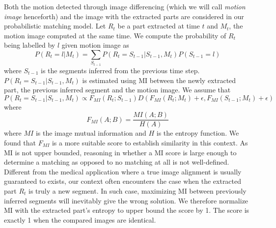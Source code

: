 \documentclass{article}
\begin{document}
Both the motion detected through image differencing (which we will call \emph{motion image} henceforth) and the image with the extracted parts are considered in our probabilistic matching model. Let $R_t$ be a part extracted at time $t$ and $M_t$, the motion image computed at the same time. We compute the probability of $R_t$ being labelled by $l$ given motion image as
\begin{equation}
	P(R_t = l | M_t) = \sum_{S_{t-1}} P(R_t = S_{t-1} | S_{t-1}, M_t)P(S_{t-1} = l)
\end{equation}
where $S_{t-1}$ is the segments inferred from the previous time step. $P(R_t = S_{t-1} | S_{t-1}, M_t)$ is estimated using MI between the newly extracted part, the previous inferred segment and the motion image. We assume that 
\begin{equation}\label{eq:blab}
	P(R_t = S_{t-1} | S_{t-1}, M_t) \propto F_{MI}(R_t; S_{t-1})D(F_{MI}(R_t; M_t) + \epsilon, F_{MI}(S_{t-1}; M_t) + \epsilon)
\end{equation}
where
\begin{equation}
	F_{MI}(A;B) = \frac{MI(A;B)}{H(A)}
\end{equation}
where $MI$ is the image mutual information and $H$ is the entropy function. We found that $F_{MI}$ is a more suitable score to establish similarity in this context. As MI is not upper bounded, reasoning in whether a MI score is large enough to determine a matching as opposed to no matching at all is not well-defined. Different from the medical application where a true image alignment is usually guaranteed to exists, our context often encounters the case when the extracted part $R_t$ is truly a new segment. In such case, maximizing MI between previously inferred segments will inevitably give the wrong solution. We therefore normalize MI with the extracted part's entropy to upper bound the score by 1. The score is exactly 1 when the compared images are identical. 
\end{document}
